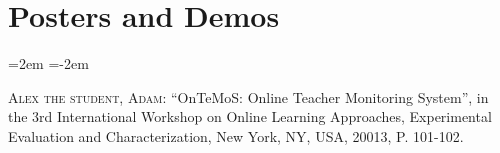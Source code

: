 \section*{Posters and Demos}
\begin{list}{}
	{\leftmargin=2em \itemindent=-2em}
	\item 
	\textsc{Alex the student, Adam}: ``OnTeMoS: Online Teacher Monitoring System'', in the 3rd International Workshop on Online Learning Approaches, Experimental Evaluation and Characterization, New York, NY, USA, 20013, P. 101\hbox{-}102.
\end{list}